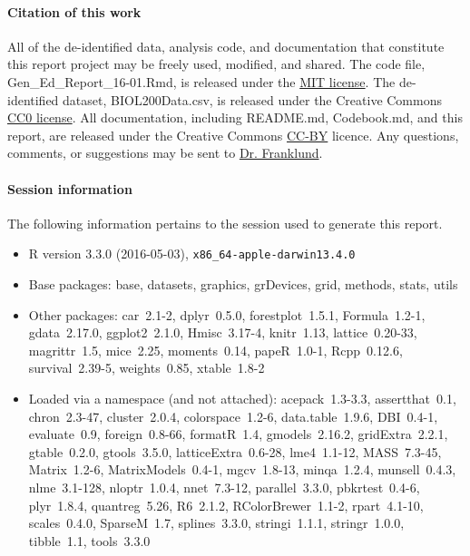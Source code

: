 \documentclass[fleqn,10pt]{SelfArx}\usepackage[]{graphicx}\usepackage[]{color}
\begin{document}
\paragraph{Citation of this work}
All of the de-identified data, analysis code, and documentation that constitute this report project may be freely used, modified, and shared. The code file, Gen\_Ed\_Report\_16-01.Rmd, is released under the \href{https://opensource.org/licenses/MIT}{MIT license}. The de-identified dataset, BIOL200Data.csv, is released under the Creative Commons \href{https://creativecommons.org/publicdomain/zero/1.0/}{CC0 license}. All documentation, including README.md, Codebook.md, and this report, are released under the Creative Commons \href{https://creativecommons.org/licenses/by/4.0/}{CC-BY} licence. Any questions, comments, or suggestions may be sent to \href{mailto:CliftonFranklund@ferris.edu}{Dr. Franklund}.

\paragraph{Session information}
The following information pertains to the session used to generate this report.
\begin{itemize}\raggedright
  \item R version 3.3.0 (2016-05-03), \verb|x86_64-apple-darwin13.4.0|
  \item Base packages: base, datasets, graphics, grDevices, grid,
    methods, stats, utils
  \item Other packages: car~2.1-2, dplyr~0.5.0, forestplot~1.5.1,
    Formula~1.2-1, gdata~2.17.0, ggplot2~2.1.0, Hmisc~3.17-4,
    knitr~1.13, lattice~0.20-33, magrittr~1.5, mice~2.25,
    moments~0.14, papeR~1.0-1, Rcpp~0.12.6, survival~2.39-5,
    weights~0.85, xtable~1.8-2
  \item Loaded via a namespace (and not attached):
    acepack~1.3-3.3, assertthat~0.1, chron~2.3-47, cluster~2.0.4,
    colorspace~1.2-6, data.table~1.9.6, DBI~0.4-1, evaluate~0.9,
    foreign~0.8-66, formatR~1.4, gmodels~2.16.2, gridExtra~2.2.1,
    gtable~0.2.0, gtools~3.5.0, latticeExtra~0.6-28, lme4~1.1-12,
    MASS~7.3-45, Matrix~1.2-6, MatrixModels~0.4-1, mgcv~1.8-13,
    minqa~1.2.4, munsell~0.4.3, nlme~3.1-128, nloptr~1.0.4,
    nnet~7.3-12, parallel~3.3.0, pbkrtest~0.4-6, plyr~1.8.4,
    quantreg~5.26, R6~2.1.2, RColorBrewer~1.1-2, rpart~4.1-10,
    scales~0.4.0, SparseM~1.7, splines~3.3.0, stringi~1.1.1,
    stringr~1.0.0, tibble~1.1, tools~3.3.0
\end{itemize}
\end{document}
